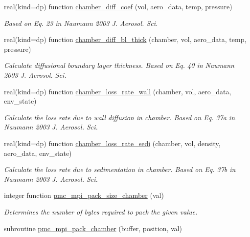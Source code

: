 \begin{DoxyCompactItemize}
\item 
real(kind=dp) function \mbox{\hyperlink{namespacepmc__chamber_a2460ba62fd341138dcd48ab0ce8d2ee0}{chamber\+\_\+diff\+\_\+coef}} (vol, aero\+\_\+data, temp, pressure)
\begin{DoxyCompactList}\small\item\em Based on Eq. 23 in Naumann 2003 J. Aerosol. Sci. \end{DoxyCompactList}\item 
real(kind=dp) function \mbox{\hyperlink{namespacepmc__chamber_a915f3d6e535e4f3a792faf470e74aa59}{chamber\+\_\+diff\+\_\+bl\+\_\+thick}} (chamber, vol, aero\+\_\+data, temp, pressure)
\begin{DoxyCompactList}\small\item\em Calculate diffusional boundary layer thickness. Based on Eq. 40 in Naumann 2003 J. Aerosol. Sci. \end{DoxyCompactList}\item 
real(kind=dp) function \mbox{\hyperlink{namespacepmc__chamber_a0a0fd4cf1b9ff4af75d0df89cf2c0c4e}{chamber\+\_\+loss\+\_\+rate\+\_\+wall}} (chamber, vol, aero\+\_\+data, env\+\_\+state)
\begin{DoxyCompactList}\small\item\em Calculate the loss rate due to wall diffusion in chamber. Based on Eq. 37a in Naumann 2003 J. Aerosol. Sci. \end{DoxyCompactList}\item 
real(kind=dp) function \mbox{\hyperlink{namespacepmc__chamber_adfd6bc1ce1607e8180e56f2420c3fb0f}{chamber\+\_\+loss\+\_\+rate\+\_\+sedi}} (chamber, vol, density, aero\+\_\+data, env\+\_\+state)
\begin{DoxyCompactList}\small\item\em Calculate the loss rate due to sedimentation in chamber. Based on Eq. 37b in Naumann 2003 J. Aerosol. Sci. \end{DoxyCompactList}\item 
integer function \mbox{\hyperlink{namespacepmc__chamber_a0605211b3a313af86170ab1e7240c336}{pmc\+\_\+mpi\+\_\+pack\+\_\+size\+\_\+chamber}} (val)
\begin{DoxyCompactList}\small\item\em Determines the number of bytes required to pack the given value. \end{DoxyCompactList}\item 
subroutine \mbox{\hyperlink{namespacepmc__chamber_af292d166f534af98e8c56c9b45d82909}{pmc\+\_\+mpi\+\_\+pack\+\_\+chamber}} (buffer, position, val)

\end{DoxyCompactItemize}
